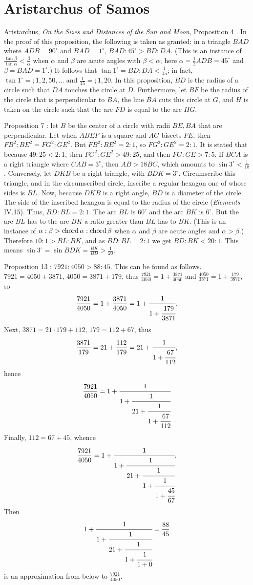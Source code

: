 \documentclass{amsart}
\newcommand{\chord}{\ensuremath\mathrm{chord}\,}
\theoremstyle{definition}
\begin{document}
\section{Aristarchus of Samos}
Aristarchus, {\em On the Sizes and Distances of the Sun and Moon}, Proposition 4 \cite[p.~367]{aristarchus}.
In the proof of this proposition, the following is taken as granted: in a triangle $BAD$ 
where $ADB=90^\circ$ and $BAD=1^\circ$, 
$BAD:45^\circ > BD:DA$. (This is an instance of
$\frac{\tan \beta}{\tan \alpha} < \frac{\beta}{\alpha}$ when $\alpha$ and $\beta$ are acute angles with $\beta<\alpha$; here
$\alpha=\frac{1}{2}ADB=45^\circ$ and $\beta = BAD=1^\circ$.)
It follows that $\tan 1^\circ = BD:DA < \frac{1}{45}$; in fact,
$\tan 1^\circ = ;1,2,50,\ldots$ and $\frac{1}{45}  = ; 1,20$. 
In this proposition, $BD$ is the radius of a circle such that $DA$ touches the circle at $D$. Furthermore, let $BF$ be the radius of the circle
that is perpendicular to $BA$, the line $BA$ cuts this circle at $G$, and $H$ is taken on the circle such that the arc $FD$ is equal
to the arc $HG$. 



Proposition 7 \cite[p.~379]{aristarchus}: let $B$ be the center of a circle with radii $BE,BA$ that are perpendicular. Let 
when $ABEF$ is a square and $AG$ bisects $FE$,
then $FB^2:BE^2 = FG^2:GE^2$.  
But $FB^2:BE^2 = 2:1$, so $FG^2:GE^2 = 2:1$. It is stated that because
$49:25<2:1$, then $FG^2:GE^2 > 49:25$, and then $FG:GE > 7:5$. 
If $BCA$ is a right triangle where $CAB = 3^\circ$, then $AB > 18 BC$, which amounts to
$\sin 3^\circ < \frac{1}{18}$. 
Conversely, let $DKB$ be a right triangle, with $BDK=3^\circ$. Circumscribe this triangle, and in the circumscribed circle, inscribe a
regular hexagon one of whose sides is $BL$. Now, because $DKB$ is a right angle, $BD$ is  a diameter of the circle.
The side of the inscribed hexagon is equal to the radius of the circle ({\em Elements} IV.15). Thus, 
$BD:BL=2:1$. The arc $BL$ is $60^\circ$ and the arc $BK$ is $6^\circ$. But the arc $BL$ has to the arc $BK$ a ratio greater than $BL$ has to $BK$. (This is an instance of
$\alpha:\beta>\chord \alpha:\chord \beta$ when $\alpha$ and $\beta$ are acute angles and $\alpha>\beta$.)
Therefore $10:1 > BL:BK$, and as $BD:BL=2:1$ we get
$BD:BK < 20:1$. This means $\sin 3^\circ = \sin BDK = \frac{BK}{BD} > \frac{1}{20}$. 


Proposition 13 \cite[p.~397]{aristarchus}: $7921:4050>88:45$. This can be found as follows.
$7921=4050+3871$, $4050=3871+179$, thus
$\frac{7921}{4050}=1+\frac{3871}{4050}$ and $\frac{4050}{3871}=1+\frac{179}{3871}$, so
\[
\frac{7921}{4050}=1+\frac{3871}{4050} = 1+\cfrac{1}{1+\cfrac{179}{3871}}.
\] 
Next, 
$3871=21\cdot 179+112$, $179=112+67$, thus
\[
\frac{3871}{179} = 21 +  \frac{112}{179} = 21+\cfrac{1}{1+\cfrac{67}{112}},
\]
hence
\[
\frac{7921}{4050} = 1+\cfrac{1}{1+\cfrac{1}{21+\cfrac{1}{1+\cfrac{67}{112}}}}
\]
Finally, $112=67+45$, whence
\[
\frac{7921}{4050} = 1+\cfrac{1}{1+\cfrac{1}{21+\cfrac{1}{1+\cfrac{1}{1+\cfrac{45}{67}}}}}.
\] 
Then
\[
1+\cfrac{1}{1+\cfrac{1}{21+\cfrac{1}{1+\cfrac{1}{1+0}}}} = \frac{88}{45}
\]
is an approximation from below to $\frac{7921}{4050}$. 
\end{document}
